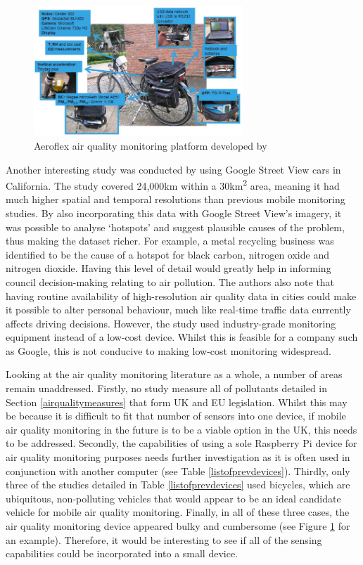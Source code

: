 \documentclass[11pt]{report}
\begin{document}
\begin{figure}[!htb]
\centering
\includegraphics[width=0.7\textwidth]{aeroflex}
\caption{Aeroflex air quality monitoring platform developed by \cite{Elen2013aeroflex}}
\label{aeroflex}
\end{figure}

Another interesting study was conducted by \cite{Apte2017googlestreetview} using Google Street View cars in California. The study covered 24,000km within a 30km\textsuperscript{2} area, meaning it had much higher spatial and temporal resolutions than previous mobile monitoring studies. By also incorporating this data with Google Street View's imagery, it was possible to analyse `hotspots' and suggest plausible causes of the problem, thus making the dataset richer. For example, a metal recycling business was identified to be the cause of a hotspot for black carbon, nitrogen oxide and nitrogen dioxide. Having this level of detail would greatly help in informing council decision-making relating to air pollution. The authors also note that having routine availability of high-resolution air quality data in cities could make it possible to alter personal behaviour, much like real-time traffic data currently affects driving decisions. However, the study used industry-grade monitoring equipment instead of a low-cost device. Whilst this is feasible for a company such as Google, this is not conducive to making low-cost monitoring widespread. 

Looking at the air quality monitoring literature as a whole, a number of areas remain unaddressed. Firstly, no study measure all of pollutants detailed in Section \ref{airqualitymeasures} that form UK and EU legislation. Whilst this may be because it is difficult to fit that number of sensors into one device, if mobile air quality monitoring in the future is to be a viable option in the UK, this needs to be addressed. Secondly, the capabilities of using a sole Raspberry Pi device for air quality monitoring purposes needs further investigation as it is often used in conjunction with another computer (see Table \ref{listofprevdevices}). Thirdly, only three of the studies detailed in Table \ref{listofprevdevices} used bicycles, which are ubiquitous, non-polluting vehicles that would appear to be an ideal candidate vehicle for mobile air quality monitoring. Finally, in all of these three cases, the air quality monitoring device appeared bulky and cumbersome (see Figure \ref{aeroflex} for an example). Therefore, it would be interesting to see if all of the sensing capabilities could be incorporated into a small device.
\end{document}
